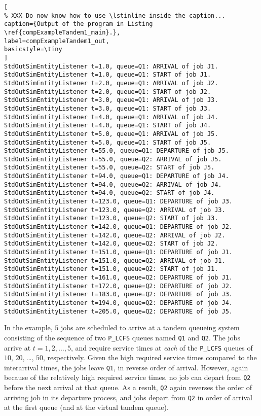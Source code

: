 \documentclass[12pt]{book}
\begin{document}
\begin{lstlisting}[
% XXX Do now know how to use \lstinline inside the caption...
caption={Output of the program in Listing \ref{compExampleTandem1_main}.},
label=compExampleTandem1_out,
basicstyle=\tiny
]
StdOutSimEntityListener t=1.0, queue=Q1: ARRIVAL of job J1.
StdOutSimEntityListener t=1.0, queue=Q1: START of job J1.
StdOutSimEntityListener t=2.0, queue=Q1: ARRIVAL of job J2.
StdOutSimEntityListener t=2.0, queue=Q1: START of job J2.
StdOutSimEntityListener t=3.0, queue=Q1: ARRIVAL of job J3.
StdOutSimEntityListener t=3.0, queue=Q1: START of job J3.
StdOutSimEntityListener t=4.0, queue=Q1: ARRIVAL of job J4.
StdOutSimEntityListener t=4.0, queue=Q1: START of job J4.
StdOutSimEntityListener t=5.0, queue=Q1: ARRIVAL of job J5.
StdOutSimEntityListener t=5.0, queue=Q1: START of job J5.
StdOutSimEntityListener t=55.0, queue=Q1: DEPARTURE of job J5.
StdOutSimEntityListener t=55.0, queue=Q2: ARRIVAL of job J5.
StdOutSimEntityListener t=55.0, queue=Q2: START of job J5.
StdOutSimEntityListener t=94.0, queue=Q1: DEPARTURE of job J4.
StdOutSimEntityListener t=94.0, queue=Q2: ARRIVAL of job J4.
StdOutSimEntityListener t=94.0, queue=Q2: START of job J4.
StdOutSimEntityListener t=123.0, queue=Q1: DEPARTURE of job J3.
StdOutSimEntityListener t=123.0, queue=Q2: ARRIVAL of job J3.
StdOutSimEntityListener t=123.0, queue=Q2: START of job J3.
StdOutSimEntityListener t=142.0, queue=Q1: DEPARTURE of job J2.
StdOutSimEntityListener t=142.0, queue=Q2: ARRIVAL of job J2.
StdOutSimEntityListener t=142.0, queue=Q2: START of job J2.
StdOutSimEntityListener t=151.0, queue=Q1: DEPARTURE of job J1.
StdOutSimEntityListener t=151.0, queue=Q2: ARRIVAL of job J1.
StdOutSimEntityListener t=151.0, queue=Q2: START of job J1.
StdOutSimEntityListener t=161.0, queue=Q2: DEPARTURE of job J1.
StdOutSimEntityListener t=172.0, queue=Q2: DEPARTURE of job J2.
StdOutSimEntityListener t=183.0, queue=Q2: DEPARTURE of job J3.
StdOutSimEntityListener t=194.0, queue=Q2: DEPARTURE of job J4.
StdOutSimEntityListener t=205.0, queue=Q2: DEPARTURE of job J5.
\end{lstlisting}

In the example, $5$ jobs are scheduled to arrive at
  a tandem queueing system consisting of
  the sequence of
  two \lstinline|P_LCFS| queues
  named
  \lstinline|Q1| and \lstinline|Q2|.
The jobs arrive at $t=1, 2, \dots, 5$,
  and require service times at {\em each\/} of the \lstinline|P_LCFS| queues
  of $10$, $20$, \ldots, $50$, respectively.
Given the high required service times compared to the
  interarrival times,
  the jobs leave \lstinline|Q1|,
  in reverse order of arrival.
However, again because of the relatively high required service times,
  no job can depart from \lstinline|Q2| before the next arrival
  at that queue.
As a result,
  \lstinline|Q2| again reverses the order of arriving job in its departure
  process, and jobs depart from \lstinline|Q2| in order of arrival at the first queue
  (and at the virtual tandem queue).
\end{document}
